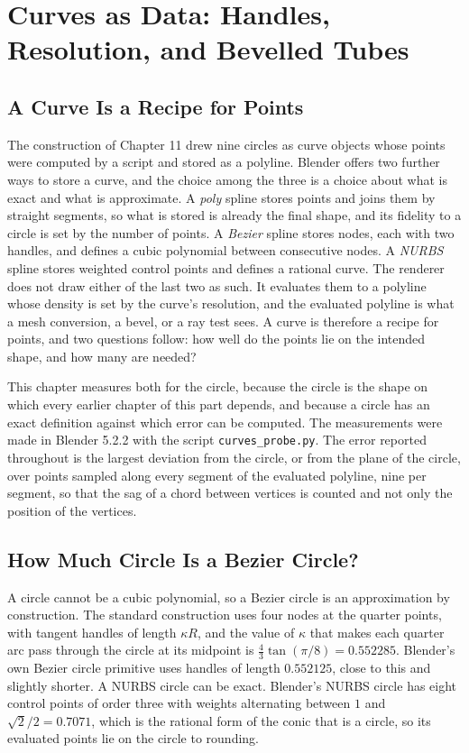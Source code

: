 \chapter{Curves as Data: Handles, Resolution, and Bevelled Tubes}

\section{A Curve Is a Recipe for Points}

The construction of Chapter 11 drew nine circles as curve objects whose points were computed by a script and stored as a polyline. Blender offers two further ways to store a curve, and the choice among the three is a choice about what is exact and what is approximate. A \emph{poly} spline stores points and joins them by straight segments, so what is stored is already the final shape, and its fidelity to a circle is set by the number of points. A \emph{Bezier} spline stores nodes, each with two handles, and defines a cubic polynomial between consecutive nodes. A \emph{NURBS} spline stores weighted control points and defines a rational curve. The renderer does not draw either of the last two as such. It evaluates them to a polyline whose density is set by the curve's resolution, and the evaluated polyline is what a mesh conversion, a bevel, or a ray test sees. A curve is therefore a recipe for points, and two questions follow: how well do the points lie on the intended shape, and how many are needed?

This chapter measures both for the circle, because the circle is the shape on which every earlier chapter of this part depends, and because a circle has an exact definition against which error can be computed. The measurements were made in Blender 5.2.2 with the script \texttt{curves\_probe.py}. The error reported throughout is the largest deviation from the circle, or from the plane of the circle, over points sampled along every segment of the evaluated polyline, nine per segment, so that the sag of a chord between vertices is counted and not only the position of the vertices.

\section{How Much Circle Is a Bezier Circle?}

A circle cannot be a cubic polynomial, so a Bezier circle is an approximation by construction. The standard construction uses four nodes at the quarter points, with tangent handles of length $\kappa R$, and the value of $\kappa$ that makes each quarter arc pass through the circle at its midpoint is $\tfrac43\tan(\pi/8)=0.552285$. Blender's own Bezier circle primitive uses handles of length $0.552125$, close to this and slightly shorter. A NURBS circle can be exact. Blender's NURBS circle has eight control points of order three with weights alternating between $1$ and $\sqrt2/2=0.7071$, which is the rational form of the conic that is a circle, so its evaluated points lie on the circle to rounding.


